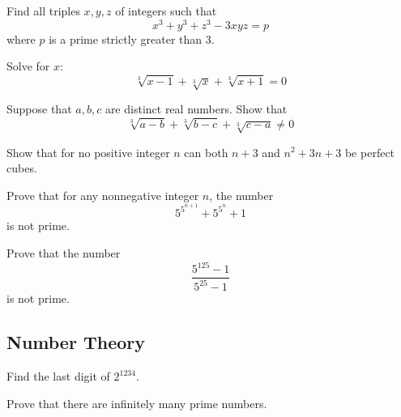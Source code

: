 \documentclass[12pt]{article}
\begin{document}
        \begin{exercise}
            Find all triples $x,y,z$ of integers such that 
            \begin{equation*}
                x^3 + y^3 + z^3 -3xyz = p
            \end{equation*}
            where $p$ is a prime strictly greater than 3.
        \end{exercise}
            
            \begin{exercise}
            Solve for $x$:
            \[\sqrt[3]{x-1} + \sqrt[3]{x}  + \sqrt[3]{x+1} = 0\]
        \end{exercise}
            
        \begin{exercise}
            Suppose that $a,b,c$ are distinct real numbers. Show that 
            \begin{equation*}
                \sqrt[3]{a - b} + \sqrt[3]{b - c}  + \sqrt[3]{c - a} \neq 0
            \end{equation*}
        \end{exercise}
            
        \begin{exercise}
            Show that for no positive integer $n$ can both $n+3$ and $n^2+3n+3$ be perfect cubes.
        \end{exercise}
            
        \begin{exercise}
            Prove that for any nonnegative integer $n$, the number
            \[5^{5^{n+1}}+5^{5^n} +1\] is not prime.
        \end{exercise}
            
        \begin{exercise}
            Prove that the number
            \[\frac{5^{125}-1}{5^{25}-1}\]
            is not prime.
        \end{exercise}

    \subsection{Number Theory}

        \begin{exercise}
            Find the last digit of \(2^{1234}\).
        \end{exercise}

        \begin{exercise}
            Prove that there are infinitely  many prime numbers.
        \end{exercise}
\end{document}
